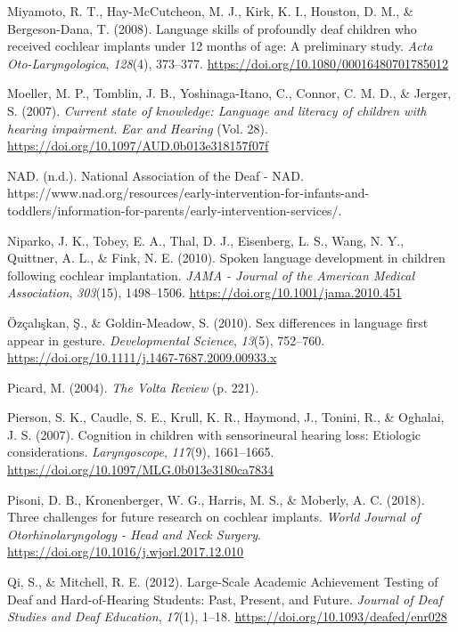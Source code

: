 \documentclass[english,man,floatsintext]{apa6}
\begin{document}
\leavevmode\hypertarget{ref-miyamoto2008}{}%
Miyamoto, R. T., Hay-McCutcheon, M. J., Kirk, K. I., Houston, D. M., \& Bergeson-Dana, T. (2008). Language skills of profoundly deaf children who received cochlear implants under 12 months of age: A preliminary study. \emph{Acta Oto-Laryngologica}, \emph{128}(4), 373--377. \url{https://doi.org/10.1080/00016480701785012}

\leavevmode\hypertarget{ref-moeller2007}{}%
Moeller, M. P., Tomblin, J. B., Yoshinaga-Itano, C., Connor, C. M. D., \& Jerger, S. (2007). \emph{Current state of knowledge: Language and literacy of children with hearing impairment}. \emph{Ear and Hearing} (Vol. 28). \url{https://doi.org/10.1097/AUD.0b013e318157f07f}

\leavevmode\hypertarget{ref-nad}{}%
NAD. (n.d.). National Association of the Deaf - NAD. https://www.nad.org/resources/early-intervention-for-infants-and-toddlers/information-for-parents/early-intervention-services/.

\leavevmode\hypertarget{ref-niparko2010}{}%
Niparko, J. K., Tobey, E. A., Thal, D. J., Eisenberg, L. S., Wang, N. Y., Quittner, A. L., \& Fink, N. E. (2010). Spoken language development in children following cochlear implantation. \emph{JAMA - Journal of the American Medical Association}, \emph{303}(15), 1498--1506. \url{https://doi.org/10.1001/jama.2010.451}

\leavevmode\hypertarget{ref-ozcaliskan2010}{}%
Özçalışkan, Ş., \& Goldin-Meadow, S. (2010). Sex differences in language first appear in gesture. \emph{Developmental Science}, \emph{13}(5), 752--760. \url{https://doi.org/10.1111/j.1467-7687.2009.00933.x}

\leavevmode\hypertarget{ref-picard2004}{}%
Picard, M. (2004). \emph{The Volta Review} (p. 221).

\leavevmode\hypertarget{ref-pierson2007}{}%
Pierson, S. K., Caudle, S. E., Krull, K. R., Haymond, J., Tonini, R., \& Oghalai, J. S. (2007). Cognition in children with sensorineural hearing loss: Etiologic considerations. \emph{Laryngoscope}, \emph{117}(9), 1661--1665. \url{https://doi.org/10.1097/MLG.0b013e3180ca7834}

\leavevmode\hypertarget{ref-pisoni2018}{}%
Pisoni, D. B., Kronenberger, W. G., Harris, M. S., \& Moberly, A. C. (2018). Three challenges for future research on cochlear implants. \emph{World Journal of Otorhinolaryngology - Head and Neck Surgery}. \url{https://doi.org/10.1016/j.wjorl.2017.12.010}

\leavevmode\hypertarget{ref-qi2012}{}%
Qi, S., \& Mitchell, R. E. (2012). Large-Scale Academic Achievement Testing of Deaf and Hard-of-Hearing Students: Past, Present, and Future. \emph{Journal of Deaf Studies and Deaf Education}, \emph{17}(1), 1--18. \url{https://doi.org/10.1093/deafed/enr028}
\end{document}
